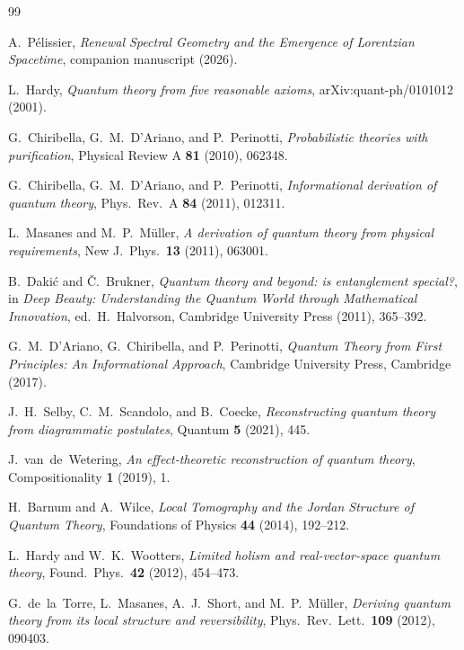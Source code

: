 \documentclass[11pt]{article}
\theoremstyle{definition}
\theoremstyle{remark}
\begin{document}
\begin{thebibliography}{99}

A.~P\'elissier,
\emph{Renewal Spectral Geometry and the Emergence of Lorentzian Spacetime},
companion manuscript (2026).


L.~Hardy,
\emph{Quantum theory from five reasonable axioms},
arXiv:quant-ph/0101012 (2001).

G.~Chiribella, G.~M.~D'Ariano, and P.~Perinotti,
\emph{Probabilistic theories with purification},
Physical Review A \textbf{81} (2010), 062348.

G.~Chiribella, G.~M.~D'Ariano, and P.~Perinotti,
\emph{Informational derivation of quantum theory},
Phys.\ Rev.\ A \textbf{84} (2011), 012311.

L.~Masanes and M.~P.~M\"uller,
\emph{A derivation of quantum theory from physical requirements},
New J.\ Phys.\ \textbf{13} (2011), 063001.

B.~Daki\'c and \v{C}.~Brukner,
\emph{Quantum theory and beyond: is entanglement special?},
in \emph{Deep Beauty: Understanding the Quantum World through
Mathematical Innovation}, ed.\ H.~Halvorson,
Cambridge University Press (2011), 365--392.

G.~M.~D'Ariano, G.~Chiribella, and P.~Perinotti,
\emph{Quantum Theory from First Principles: An Informational Approach},
Cambridge University Press, Cambridge (2017).

J.~H.~Selby, C.~M.~Scandolo, and B.~Coecke,
\emph{Reconstructing quantum theory from diagrammatic postulates},
Quantum \textbf{5} (2021), 445.

J.~van~de~Wetering,
\emph{An effect-theoretic reconstruction of quantum theory},
Compositionality \textbf{1} (2019), 1.

H.~Barnum and A.~Wilce,
\emph{Local Tomography and the Jordan Structure of Quantum Theory},
Foundations of Physics \textbf{44} (2014), 192--212.

L.~Hardy and W.~K.~Wootters,
\emph{Limited holism and real-vector-space quantum theory},
Found.\ Phys.\ \textbf{42} (2012), 454--473.

G.~de~la~Torre, L.~Masanes, A.~J.~Short, and M.~P.~M\"uller,
\emph{Deriving quantum theory from its local structure and reversibility},
Phys.\ Rev.\ Lett.\ \textbf{109} (2012), 090403.


\end{thebibliography}
\end{document}
